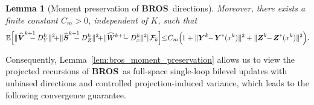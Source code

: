 \documentclass{pkumelon}
\newenvironment{limbox}{\begin{limitationbox}}{\end{limitationbox}}
\theoremstyle{plain}
\newtheorem{lemma}{Lemma}
\newcommand{\E}{\mathbb{E}}
\newcommand{\oursname}{\textnormal{\textbf{BROS}}}
\newcommand{\ours}{\oursname\ }
\begin{document}
\begin{limbox}
\begin{lemma}[Moment preservation of \ours directions]
Moreover, there exists a finite constant $C_m>0$, independent of $K$, such that
{\small
\begin{equation}
\label{eq:main_moment_bound}
\E\!\left[\|\widehat{\boldsymbol V}^{k+1}\hspace{-1.0em}-D_Y^k\|^2
\hspace{-0.4em}+\hspace{-0.2em}\|\widehat{\boldsymbol S}^{k+1}\hspace{-1.0em}-D_Z^k\|^2
\hspace{-0.4em}+\hspace{-0.2em}\|\widehat W^{k+1}\hspace{-0.6em}-D_x^k\|^2\hspace{-0.3em}\mid\hspace{-0.2em}\mathcal F_k\right] \hspace{-0.3em}\le\hspace{-0.2em} C_m\Bigl(\hspace{-0.1em}1+\|\boldsymbol Y^k\hspace{-0.3em}-\hspace{-0.1em}\boldsymbol Y^*(x^k)\|^2+\|\boldsymbol Z^k\hspace{-0.3em}-\hspace{-0.1em}\boldsymbol Z^*(x^k)\|^2\Bigr).
\end{equation}
}
\end{lemma}
\end{limbox}
Consequently, Lemma~\ref{lem:bros_moment_preservation} allows us to view the projected recursions of \ours as full-space single-loop bilevel updates with unbiased directions and controlled projection-induced variance, which leads to the following convergence guarantee.
\end{document}
